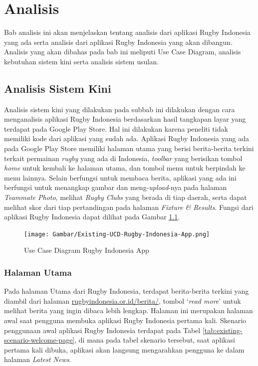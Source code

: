 \chapter{Analisis}
\label{chap:analisis}

Bab analisis ini akan menjelaskan tentang analisis dari aplikasi Rugby Indonesia yang ada serta analisis dari aplikasi Rugby Indonesia yang akan dibangun. Analisis yang akan dibahas pada bab ini meliputi Use Case Diagram, analisis kebutuhan sistem kini serta analisis sistem usulan.

\section{Analisis Sistem Kini}
Analisis sistem kini yang dilakukan pada subbab ini dilakukan dengan cara menganalisis aplikasi Rugby Indonesia berdasarkan hasil tangkapan layar yang terdapat pada Google Play Store. Hal ini dilakukan karena peneliti tidak memiliki kode dari aplikasi yang sudah ada. Aplikasi Rugby Indonesia yang ada pada Google Play Store memiliki halaman utama yang berisi berita-berita terkini terkait permainan \textit{rugby} yang ada di Indonesia, \textit{toolbar} yang berisikan tombol \textit{home} untuk kembali ke halaman utama, dan tombol menu untuk berpindah ke menu lainnya. Selain berfungsi untuk membaca berita, aplikasi yang ada ini berfungsi untuk menangkap gambar dan meng-\textit{upload}-nya pada halaman \textit{Teammate Photo}, melihat \textit{Rugby Clubs} yang berada di tiap daerah, serta dapat melihat skor dari tiap pertandingan pada halaman \textit{Fixture \& Results}. Fungsi dari aplikasi Rugby Indonesia dapat dilihat pada Gambar \ref{fig:ucd-rugby-indonesia-app}.

\begin{figure} [H]
    \centering
    \texttt{[image: Gambar/Existing-UCD-Rugby-Indonesia-App.png]}
    \caption{Use Case Diagram Rugby Indonesia App}
    \label{fig:ucd-rugby-indonesia-app}
\end{figure}

\subsection{Halaman Utama}
Pada halaman Utama dari Rugby Indonesia, terdapat berita-berita terkini yang diambil dari halaman \url{rugbyindonesia.or.id/berita/}, tombol `\textit{read more}' untuk melihat berita yang ingin dibaca lebih lengkap. Halaman ini merupakan halaman awal saat pengguna membuka aplikasi Rugby Indonesia pertama kali. Skenario penggunaan awal aplikasi Rugby Indonesia terdapat pada Tabel \ref{tab:existing-scenario-welcome-page}, di mana pada tabel skenario tersebut, saat aplikasi pertama kali dibuka, aplikasi akan langsung mengarahkan pengguna ke dalam halaman\textit{ Latest News}.

